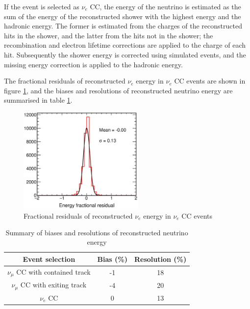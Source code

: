 If the event is selected as $\nu_{e}$ CC, the energy of the 
neutrino is estimated as the sum of the energy of the reconstructed shower with the highest energy and the hadronic energy. The former is estimated from the charges of the reconstructed 
hits in the shower, and the latter from the hits not in the shower; the recombination and electron lifetime corrections are applied to the charge of each hit. Subsequently the shower 
energy is corrected using simulated events, and the missing energy correction is applied to the hadronic energy.

The fractional residuals of reconstructed $\nu_{e}$ energy in $\nu_{e}$ CC events are shown in figure \ref{fig:enresnue}, and the biases and resolutions of reconstructed neutrino energy 
are summarised in table \ref{tab:ressummary}.

\begin{figure}[h]
    \centering
        \includegraphics[width=0.55\textwidth]{graphics/EnergyResNue.eps}
        \caption{Fractional residuals of reconstructed $\nu_{e}$ energy in $\nu_{e}$ CC events}
        \label{fig:enresnue}
\end{figure}

\begin{table}[h]
\begin{center}
\begin{tabular}{|c|c|c|}
\hline  
 Event selection  &   Bias (\%) & Resolution (\%) \\ \hline
\hline
 $\nu_{\mu}$ CC with contained track  &   -1  &  18   \\ \hline
 $\nu_{\mu}$ CC with exiting track  &  -4   &  20 \\ \hline
 $\nu_{e}$ CC    &  0 & 13    \\ \hline
\end{tabular}
\caption{Summary of biases and resolutions of reconstructed neutrino energy}
\label{tab:ressummary}
\end{center}
\end{table}

